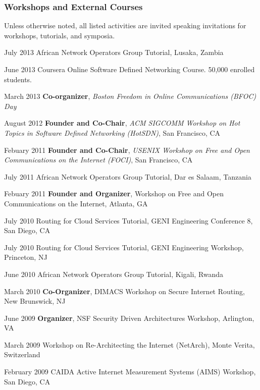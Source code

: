 \subsubsection{Workshops and External Courses}

Unless otherwise noted, all listed activities are invited speaking
invitations for workshops, tutorials, and symposia. 

\begin{cvlist}{}
\item[July 2013] {African Network Operators Group Tutorial, Lusaka, Zambia}
\item[June 2013] {Coursera Online Software Defined Networking Course.
    50,000 enrolled students.}
\item[March 2013] {\bf Co-organizer}, {\em Boston Freedom in Online
  Communications (BFOC) Day}
\item[August 2012] {\bf Founder and Co-Chair}, {{\em ACM SIGCOMM
    Workshop on Hot Topics in Software Defined Networking (HotSDN)}, San
  Francisco, CA} 
\item[Febuary 2011] {\bf Founder and Co-Chair}, {{\em USENIX Workshop on Free and
  Open Communications on the Internet (FOCI)}, San Francisco, CA}
\item[July 2011] {African Network Operators Group Tutorial, Dar es
  Salaam, Tanzania}
\item[Febuary 2011] {\bf Founder and Organizer}, {Workshop on Free and
  Open Communications on the Internet, Atlanta, GA}
\item[July 2010] {Routing for Cloud Services Tutorial, GENI Engineering
  Conference 8, San Diego, CA}
\item[July 2010] {Routing for Cloud Services Tutorial, GENI Engineering
  Workshop, Princeton, NJ}
\item[June 2010] {African Network Operators Group Tutorial, Kigali, Rwanda}
\item[March 2010] {\bf Co-Organizer}, {DIMACS Workshop on Secure
  Internet Routing, New Brunswick, NJ}
\item[June 2009] {\bf Organizer}, {NSF Security Driven Architectures
  Workshop, Arlington, VA}\nw
\item[March 2009] {Workshop on Re-Architecting the Internet (NetArch),
  Monte Verita, Switzerland}\nw
\item[February 2009] {CAIDA Active Internet Measurement Systems (AIMS)
  Workshop, San Diego, CA}\nw

\end{cvlist}

